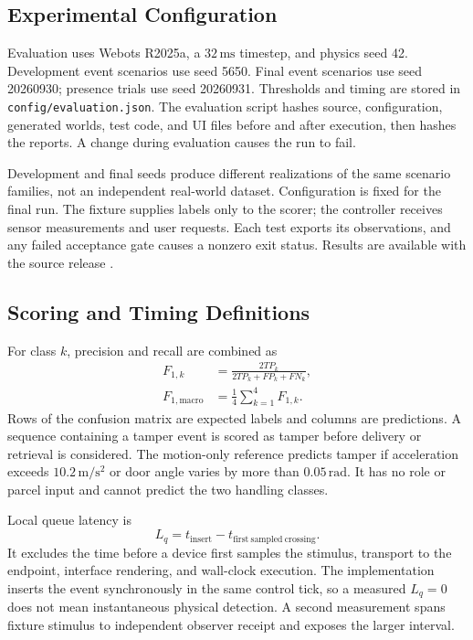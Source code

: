 \documentclass[conference,letterpaper]{IEEEtran}
\newcommand{\code}[1]{\texttt{\small #1}}
\begin{document}
\subsection{Experimental Configuration}
Evaluation uses Webots R2025a, a $32\,\mathrm{ms}$ timestep, and physics seed 42. Development event scenarios use seed 5650. Final event scenarios use seed 20260930; presence trials use seed 20260931. Thresholds and timing are stored in \code{config/evaluation.json}. The evaluation script hashes source, configuration, generated worlds, test code, and UI files before and after execution, then hashes the reports. A change during evaluation causes the run to fail.

Development and final seeds produce different realizations of the same scenario families, not an independent real-world dataset. Configuration is fixed for the final run. The fixture supplies labels only to the scorer; the controller receives sensor measurements and user requests. Each test exports its observations, and any failed acceptance gate causes a nonzero exit status. Results are available with the source release \cite{repository}.

\subsection{Scoring and Timing Definitions}
For class $k$, precision and recall are combined as
\begin{equation}
\begin{aligned}
F_{1,k}&=\frac{2TP_k}{2TP_k+FP_k+FN_k},\\
F_{1,\mathrm{macro}}&=\frac{1}{4}\sum_{k=1}^{4}F_{1,k}.
\end{aligned}
\end{equation}
Rows of the confusion matrix are expected labels and columns are predictions. A sequence containing a tamper event is scored as tamper before delivery or retrieval is considered. The motion-only reference predicts tamper if acceleration exceeds $10.2\,\mathrm{m/s^2}$ or door angle varies by more than $0.05\,\mathrm{rad}$. It has no role or parcel input and cannot predict the two handling classes.

Local queue latency is
\begin{equation}
L_q=t_{\mathrm{insert}}-t_{\mathrm{first\ sampled\ crossing}}.
\end{equation}
It excludes the time before a device first samples the stimulus, transport to the endpoint, interface rendering, and wall-clock execution. The implementation inserts the event synchronously in the same control tick, so a measured $L_q=0$ does not mean instantaneous physical detection. A second measurement spans fixture stimulus to independent observer receipt and exposes the larger interval.
\end{document}
